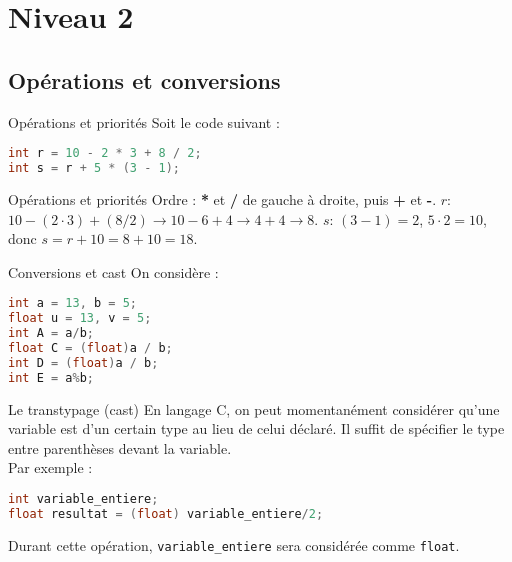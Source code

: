 \section{Niveau 2}

\subsection{Opérations et conversions}

\begin{UPSTIexercice}{Opérations et priorités}
Soit le code suivant : 
\begin{lstlisting}[language=C]
int r = 10 - 2 * 3 + 8 / 2;
int s = r + 5 * (3 - 1);
\end{lstlisting}
\end{UPSTIexercice}

\begin{UPSTIprofOnlyEnv}
  \begin{UPSTIcorrectionP}{Opérations et priorités}
    Ordre : \textbf{*} et \textbf{/} de gauche à droite, puis \textbf{+} et \textbf{-}.  
    $r$: $10 - (2\cdot3) + (8/2) \rightarrow 10 - 6 + 4 \rightarrow 4 + 4 \rightarrow \boxed{8}$.  
    $s$: $(3-1)=2$, $5\cdot2=10$, donc $s=r+10=8+10=\boxed{18}$.
  \end{UPSTIcorrectionP}
\end{UPSTIprofOnlyEnv}

\noindent\begin{minipage}{.49\linewidth}
\begin{UPSTIexercice}{Conversions et cast}
On considère :
\begin{lstlisting}[language=C]
int a = 13, b = 5;
float u = 13, v = 5;
int A = a/b;
float C = (float)a / b;
int D = (float)a / b;
int E = a%b;
\end{lstlisting}
\end{UPSTIexercice}
\end{minipage}\hfill
\begin{minipage}{.49\linewidth}
    \begin{UPSTIinfor}{Le transtypage (cast)}
        En langage C, on peut momentanément considérer qu'une variable est d'un certain type au lieu de celui déclaré. Il suffit de spécifier le type entre parenthèses devant la variable. \\
        Par exemple : 
        \begin{lstlisting}[language=c]
int variable_entiere;
float resultat = (float) variable_entiere/2;
        \end{lstlisting}
        Durant cette opération, \verb|variable_entiere| sera considérée comme \verb|float|.
    \end{UPSTIinfor}
\end{minipage}

